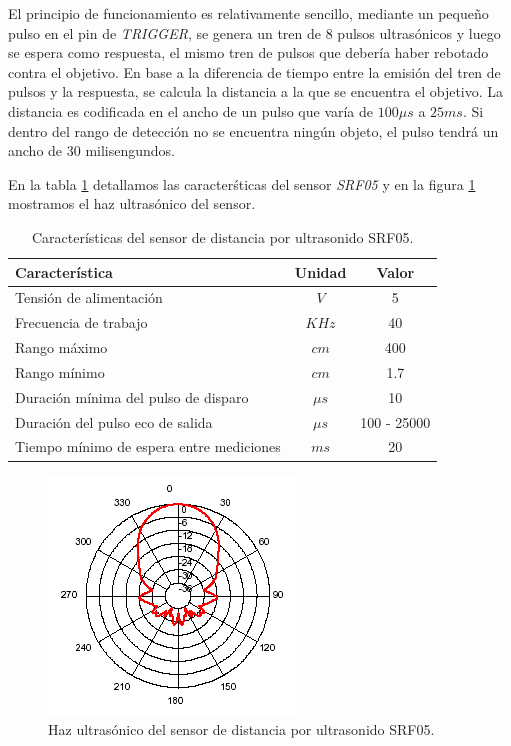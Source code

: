 	El principio de funcionamiento es relativamente sencillo, mediante un peque\~no pulso en el pin de \emph{TRIGGER}, se genera un tren de $8$ pulsos
	ultras\'onicos y luego se espera como respuesta, el mismo tren de pulsos que deber\'ia haber rebotado contra el objetivo. En base a la diferencia de tiempo
	entre la emisi\'on del tren de pulsos y la respuesta, se calcula la distancia a la que se encuentra el objetivo. La distancia es codificada en el ancho
	de un pulso que var\'ia de $100\mu s$ a $25 ms$. Si dentro del rango de detecci\'on no se encuentra ning\'un objeto, el pulso tendr\'a un ancho
	de $30$ milisengundos.
	
	En la tabla \ref{HTultrasonido} detallamos las caracter\'sticas del sensor \emph{SRF05} y en la figura \ref{HFultrasonido} mostramos el haz ultras\'onico
	del sensor.
	
	\begin{table}[ht]
		\begin{center}
			\begin{tabular}{|l|c|c|}
				\hline
				Caracter\'istica & Unidad & Valor\\
				\hline
				Tensi\'on de alimentaci\'on & $V$ & 5 \\
				Frecuencia de trabajo & $KHz$ & 40 \\
				Rango m\'aximo & $cm$ & 400 \\
				Rango m\'inimo & $cm$ & 1.7 \\
				Duración m\'inima del pulso de disparo & $\mu s$ & 10 \\
				Duración del pulso eco de salida & $\mu s$& 100 - 25000 \\
				Tiempo m\'inimo de espera entre mediciones & $m s$ & 20 \\
				\hline
			\end{tabular}
		\end{center}
		\caption{Caracter\'isticas del sensor de distancia por ultrasonido SRF05.}
		\label{HTultrasonido}
	\end{table}
	
	\begin{figure}[ht]
		\centering
		\includegraphics[scale=0.5]{us-beam.png}
		\caption{Haz ultras\'onico del sensor de distancia por ultrasonido SRF05.}
		\label{HFultrasonido}
	\end{figure}


